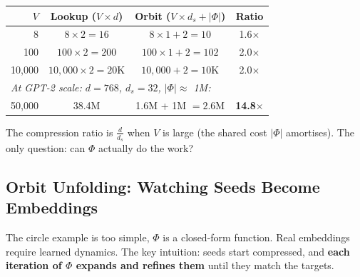 \documentclass[11pt, a4paper]{article}
\theoremstyle{remark}
\begin{document}
\begin{center}
\renewcommand{\arraystretch}{1.3}
\begin{tabular}{rccc}
\toprule
$V$ & Lookup ($V \times d$) & Orbit ($V \times d_s + |\Phi|$) & \textbf{Ratio} \\
\midrule
8 & $8 \times 2 = 16$ & $8 \times 1 + 2 = 10$ & 1.6$\times$ \\
100 & $100 \times 2 = 200$ & $100 \times 1 + 2 = 102$ & 2.0$\times$ \\
10{,}000 & $10{,}000 \times 2 = 20\text{K}$ & $10{,}000 + 2 = 10\text{K}$ & 2.0$\times$ \\
\midrule
\multicolumn{4}{l}{\textit{At GPT-2 scale: $d = 768$, $d_s = 32$, $|\Phi| \approx$ 1M:}} \\
50{,}000 & 38.4M & 1.6M + 1M $= 2.6$M & \textbf{14.8$\times$} \\
\bottomrule
\end{tabular}
\end{center}

The compression ratio is $\frac{d}{d_s}$ when $V$ is large (the shared cost $|\Phi|$ amortises).
The only question: can $\Phi$ actually do the work?


\subsection{Orbit Unfolding: Watching Seeds Become Embeddings}

The circle example is too simple, $\Phi$ is a closed-form function.
Real embeddings require learned dynamics.
The key intuition: seeds start compressed, and \textbf{each iteration of $\Phi$ expands and refines them} until they match the targets.
\end{document}
